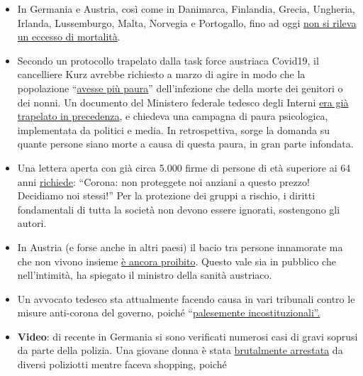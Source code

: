 \begin{itemize}
\tightlist
\item
  In Germania e Austria, così come in Danimarca, Finlandia, Grecia,
  Ungheria, Irlanda, Lussemburgo, Malta, Norvegia e Portogallo, fino ad
  oggi \href{https://www.euromomo.eu/graphs-and-maps/}{non si rileva un
  eccesso di mortalità}.
\item
  Secondo un protocollo trapelato dalla task force austriaca Covid19, il
  cancelliere Kurz avrebbe richiesto a marzo di agire in modo che la
  popolazione
  ``\href{https://www.derstandard.de/story/2000117131591/sitzungsprotokoll-der-taskforce-corona-ueber-zu-wenig-angst-in-der}{avesse
  più paura}'' dell'infezione che della morte dei genitori o dei nonni.
  Un documento del Ministero federale tedesco degli Interni
  \href{https://fragdenstaat.de/dokumente/4123-wie-wir-covid-19-unter-kontrolle-bekommen/}{era
  già trapelato in precedenza}, e chiedeva una campagna di paura
  psicologica, implementata da politici e media. In retrospettiva, sorge
  la domanda su quante persone siano morte a causa di questa paura, in
  gran parte infondata.
\item
  Una lettera aperta con già circa 5.000 firme di persone di età
  superiore ai 64 anni
  \href{https://www.change.org/p/bundeskanzlerin-corona-sch\%C3\%BCtzen-sie-\%C3\%A4ltere-nicht-um-diesen-preis-selbstbestimmt-altern-und-sterben}{richiede}:
  ``Corona: non proteggete noi anziani a questo prezzo! Decidiamo noi
  stessi!'' Per la protezione dei gruppi a rischio, i diritti
  fondamentali di tutta la società non devono essere ignorati,
  sostengono gli autori.
\item
  In Austria (e forse anche in altri paesi) il bacio tra persone
  innamorate ma che non vivono insieme
  \href{https://www.unsertirol24.com/2020/04/29/oeffentliches-kuessen-wird-unter-strafe-gestellt/}{è
  ancora proibito}. Questo vale sia in pubblico che nell'intimità, ha
  spiegato il ministro della sanità austriaco.
\item
  Un avvocato tedesco sta attualmente facendo causa in vari tribunali
  contro le misure anti-corona del governo, poiché
  ``\href{https://www.rubikon.news/artikel/eklatant-verfassungswidrig-2}{palesemente
  incostituzionali''.}
\item
  \textbf{Video}: di recente in Germania si sono verificati numerosi
  casi di gravi soprusi da parte della polizia. Una giovane donna è
  stata \href{https://www.youtube.com/watch?v=TZrKv4-jkK8}{brutalmente
  arrestata} da diversi poliziotti mentre faceva shopping, poiché

\end{itemize}
